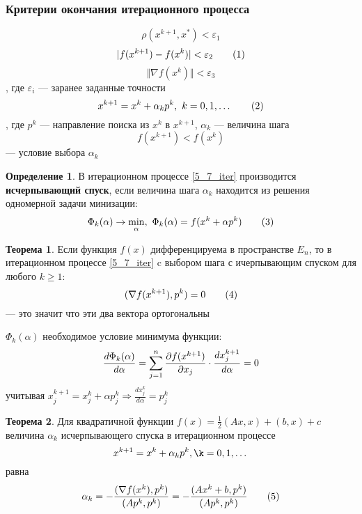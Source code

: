 \documentclass[english]{article}
\newcommand\addtag{\refstepcounter{equation}\tag{\theequation}}
\theoremstyle{plain}
\theoremstyle{remark}
\theoremstyle{definition}
\newtheorem{theorem}{Теорема}[section]
\newtheorem*{definition}{Определение}
\begin{document}
\subsubsection{Критерии окончания итерационного процесса}
\label{sec:orgc02dbb4}
\[ \rho(x^{k + 1}, x^*) < \varepsilon_1 \]
\[ |f(x^{k + 1}) - f(x^k)| < \varepsilon_2 \addtag\label{5_6_eps2}\]
\[ \Vert \nabla f(x^k) \Vert < \varepsilon_3 \]
, где \(\varepsilon_i\) --- заранее заданные точности
\[ x^{k + 1} = x^k + \alpha_k p^k,\ k=0, 1, \dots \addtag\label{5_7_iter}\]
, где \(p^k\) --- направление поиска из \(x^k\) в \(x^{k + 1}\), \(\alpha_k\) --- величина шага
\[ f(x^{k + 1}) < f(x^k) \] --- условие выбора \(\alpha_k\)
\begin{definition}
В итерационном процессе \ref{5_7_iter} производится \textbf{исчерпывающий спуск}, если величина шага \(\alpha_k\) находится из решения одномерной задачи минизации:
\[ \Phi_k(\alpha) \to \min_\alpha,\ \Phi_k(\alpha) = f(x^k + \alpha p^k) \addtag\label{5_8_cond}\]
\end{definition}
\begin{theorem}
Если функция \(f(x)\) дифференцируема в пространстве \(E_n\), то в итерационном процессе \ref{5_7_iter} c выбором шага с ичерпывающим спуском для любого \(k \ge 1\):
\[ (\nabla f(x^{k + 1}), p^k) = 0 \addtag\label{5_9_orto}\]
--- это значит что эти два вектора ортогональны
\end{theorem}
 \(\Phi_k(\alpha)\) необходимое условие минимума функции:
\[ \frac{d\Phi_k(\alpha)}{d \alpha} = \sum^n_{j = 1} \frac{\partial f(x^{k + 1})}{\partial x_j} \cdot \frac{d x_j^{k + 1}}{d \alpha} = 0 \]
учитывая \(x_j^{k + 1} = x_j^k + \alpha p_j^k \Rightarrow \frac{dx^k_j}{d\alpha} = p_j^k\)

\begin{theorem}
Для квадратичной функции \(f(x) = \frac{1}{2}(Ax, x) + (b ,x) + c\) величина \(\alpha_k\) исчерпывающего спуска в итерационном процессе
\[ x^{k + 1} = x^k + \alpha_k p^k, \k = 0, 1, \dots \]
равна
\[ \alpha_k = -\frac{(\nabla f(x^k), p^k)}{(A p^k, p^k)} = - \frac{(Ax^k + b, p^k)}{(Ap^k, p^k)} \addtag\label{5_10_alpha}\]
\end{theorem}
\end{document}
